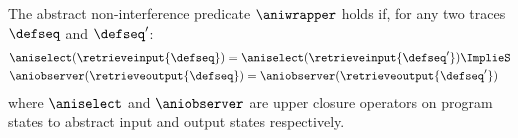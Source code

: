 
The abstract non-interference predicate $\aniwrapper$ holds if, for any two traces $\defseq$ and $\defseq'$:
\begin{eqnarray*}
  \lefteqn{\aniselect(\retrieveinput{\defseq}) = \aniselect(\retrieveinput{\defseq'})
  \ImplieS} \\
    & \aniobserver(\retrieveoutput{\defseq}) = \aniobserver(\retrieveoutput{\defseq'})
\end{eqnarray*}
where $\aniselect$ and $\aniobserver$ are upper closure operators on program states to abstract input and output states respectively.

